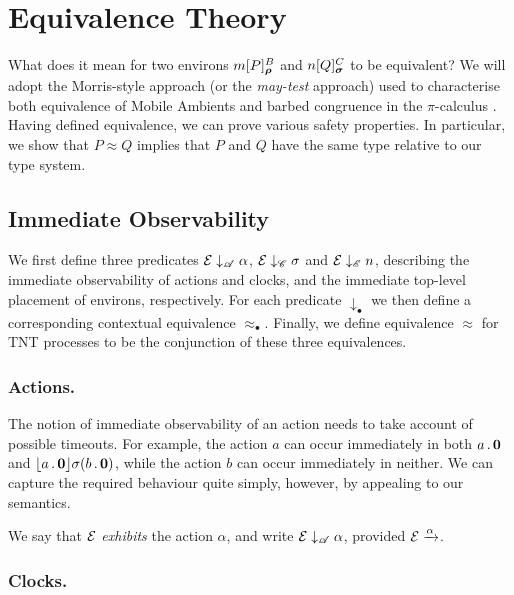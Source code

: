 \documentclass[orivec]{llncs}
\newcommand{\Exhibits}[1]{\mathrel{\downarrow_{#1}}}
\newcommand{\ExhibitsA}{\Exhibits{\mathscr{A}}}
\newcommand{\ExhibitsC}{\Exhibits{\mathscr{C}}}
\newcommand{\ExhibitsE}{\Exhibits{\mathscr{E}}}
\newcommand{\Eq}{\approx}
\newcommand{\Does}[1]{\xderives{#1}}
\begin{document}
\section{Equivalence Theory}
\label{sec:equivalence-theory}

What does it mean for two environs $\locv{m}{P}{B}{\vec\rho}$ and
$\locv{n}{Q}{C}{\vec\sigma}$ to be equivalent? We will adopt the Morris-style
approach \cite{Mor68} (or the \emph{may-test} approach) used to characterise both equivalence of Mobile Ambients \cite{GC99}
and barbed congruence in the $\pi$-calculus \cite{SW01}. Having defined
equivalence, we can prove various safety properties. In particular, we show that
$P \Eq Q$ implies that $P$ and $Q$ have the same type relative to our type
system.

\subsection{Immediate Observability}
\label{sec:immediate-observability}

We first define three predicates $\expr \ExhibitsA \alpha$, $\expr \ExhibitsC
\sigma$ and $\expr \ExhibitsE n$, describing the immediate observability
of actions and clocks, and the immediate top-level placement of environs,
respectively. For each predicate $\Exhibits{\bullet}$ we then define a
corresponding contextual equivalence $\Eq_{\bullet}$. Finally, we define
equivalence $\Eq$ for TNT processes to be the conjunction of these three
equivalences.

\subsubsection{Actions.}
The notion of immediate observability of an action needs to take account of possible timeouts. For example, the action $a$ can occur immediately in both $a\,.\,\textbf{0}$ and $\lfloor{a\,.\,\textbf{0}}\rfloor {\sigma} ({b\,.\,\textbf{0}})$, while the action $b$ can occur immediately in neither. We can capture the required behaviour quite simply, however, by appealing to our semantics.

\begin{definition}
We say that $\text{$\mathcal{E}$}$ \emph{exhibits} the action $\alpha$, and write $\expr \ExhibitsA \alpha$, provided $\expr \Does{\alpha}$.
\end{definition}


\subsubsection{Clocks.} 
\end{document}
